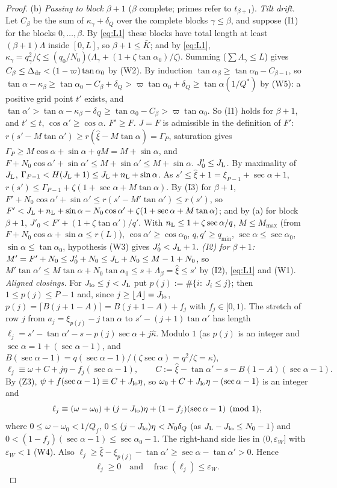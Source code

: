 \documentclass[11pt]{amsart}
\newcommand{\ca}{\cos\alpha}
\newcommand{\sa}{\sin\alpha}
\newcommand{\ta}{\tan\alpha}
\newcommand{\se}{\sec\alpha}
\newcommand{\caz}{\cos\alpha_0}
\newcommand{\taz}{\tan\alpha_0}
\newcommand{\sez}{\sec\alpha_0}
\newcommand{\Kb}{\bar K}
\theoremstyle{definition}
\theoremstyle{remark}
\numberwithin{equation}{section}
\begin{document}
\begin{proof}
(b) \emph{Passing to block $\beta+1$} ($\beta$ complete; primes refer to $t_{\beta+1}$).
\emph{Tilt drift.} Let $C_\beta$ be the sum of $\kappa_\gamma+\delta_Q$ over the complete blocks $\gamma\le\beta$, and
suppose (I1) for the blocks $0,\dots,\beta$. By \eqref{eq:L1} these blocks have total length at least
$(\beta+1)\Lambda$ inside $[0,L]$, so $\beta+1\le\Kb$; and by \eqref{eq:L1},
$\kappa_\gamma=q_\gamma^2/\zeta\le(q_0/N_0)\bigl(\Lambda_\gamma+(1+\zeta\taz)/\zeta\bigr)$. Summing ($\sum\Lambda_\gamma\le L$)
gives $C_\beta\le\Delta_{\rm dr}<(1-\varpi)\taz$ by (W2). By induction $\tan\alpha_\beta\ge\taz-C_{\beta-1}$, so
$\ta-\kappa_\beta\ge\taz-C_\beta+\delta_Q>\varpi\taz+\delta_Q\ge\tan\alpha(1/Q^*)$ by (W5): a positive grid point $t'$
exists, and $\ta'>\ta-\kappa_\beta-\delta_Q\ge\taz-C_\beta>\varpi\taz$. So (I1) holds for $\beta+1$, and $t'\le t$,
$\ca'\ge\ca$.
\emph{$F'\ge F$.} $J=F$ is admissible in the definition of $F'$:
$r(s'-M\ta')\ge r(\hat\xi-M\ta)=\Gamma_P$, saturation gives $\Gamma_P\ge M\ca+\sa+qM=M+\sa$, and
$F+N_0\ca'+\sa'\le M+\sa'\le M+\sa$.
\emph{$J'_0\le J_{\rm L}$.} By maximality of $J_{\rm L}$,
$\Gamma_{P-1}<H(J_{\rm L}+1)\le J_{\rm L}+n_{\rm L}+\sa$. As $s'\le\hat\xi+1=\xi_{P-1}+\se+1$,
$r(s')\le\Gamma_{P-1}+\zeta(1+\se+M\ta)$. By (I3) for $\beta+1$,
$F'+N_0\ca'+\sa'\le r(s'-M'\ta')\le r(s')$, so $F'<J_{\rm L}+n_{\rm L}+\sa-N_0\ca'+\zeta(1+\se+M\ta)$; and by (a) for
block $\beta+1$, $J'_0<F'+(1+\zeta\ta')/q'$. With $n_{\rm L}\le1+\zeta\se/q$, $M\le M_{\max}$ (from $F+N_0\ca+\sa\le r(L)$),
$\ca'\ge\caz$, $q,q'\ge q_{\min}$, $\se\le\sez$, $\sa\le\taz$, hypothesis (W3) gives $J'_0<J_{\rm L}+1$.
\emph{(I2) for $\beta+1$:} $M'=F'+N_0\le J'_0+N_0\le J_{\rm L}+N_0\le M-1+N_0$, so
$M'\ta'\le M\ta+N_0\taz\le s+\Lambda_\beta=\hat\xi\le s'$ by (I2), \eqref{eq:L1} and (W1).
\emph{Aligned closings.} For $J_{\rm lo}\le j<J_{\rm L}$ put $p(j):=\#\{i:\ J_i\le j\}$; then $1\le p(j)\le P-1$ and,
since $j\ge\lfloor A\rfloor=J_{\rm lo}$, $p(j)=\lceil B(j+1-A)\rceil=B(j+1-A)+f_j$ with $f_j\in[0,1)$. The stretch of row
$j$ from $a_j=\xi_{p(j)}-j\ta$ to $s'-(j+1)\ta'$ has length $\ell_j=s'-\ta'-s-p(j)\se+j\hat\kappa$. Modulo $1$ (as
$p(j)$ is an integer and $\se=1+(\se-1)$, and $B(\se-1)=q(\se-1)/(\zeta\se)=q^2/\zeta=\kappa$),
\[
\ell_j\equiv\omega+C+j\eta-f_j(\se-1),\qquad C:=\hat\xi-\ta'-s-B(1-A)(\se-1).
\]
By (Z3), $\psi+f(\se-1)\equiv C+J_{\rm lo}\eta$, so $\omega_0+C+J_{\rm lo}\eta-(\se-1)$ is an integer and
\[
\ell_j\equiv(\omega-\omega_0)+(j-J_{\rm lo})\eta+(1-f_j)(\se-1)\pmod1,
\]
where $0\le\omega-\omega_0<1/Q_f$, $0\le(j-J_{\rm lo})\eta<N_0\delta_Q$ (as $J_{\rm L}-J_{\rm lo}\le N_0-1$) and
$0<(1-f_j)(\se-1)\le\sez-1$. The right-hand side lies in $(0,\varepsilon_W]$ with $\varepsilon_W<1$ (W4). Also
$\ell_j\ge\hat\xi-\xi_{p(j)}-\ta'\ge\se-\ta'>0$. Hence
\[
\ell_j\ge0\quad\text{and}\quad\operatorname{frac}(\ell_j)\le\varepsilon_W .\tag{R}
\]


\end{proof}
\end{document}
